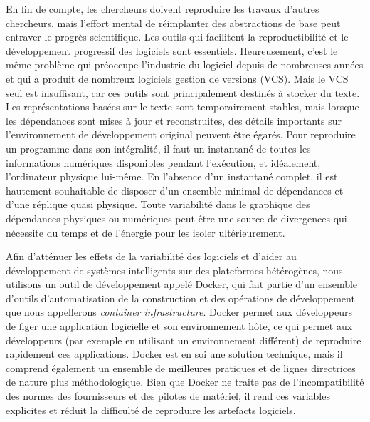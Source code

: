 En fin de compte, les chercheurs doivent reproduire les travaux d'autres chercheurs, mais l'effort mental de réimplanter des abstractions de base peut entraver le progrès scientifique. Les outils qui facilitent la reproductibilité et le développement progressif des logiciels sont essentiels. Heureusement, c'est le même problème qui préoccupe l'industrie du logiciel depuis de nombreuses années et qui a produit de nombreux logiciels gestion de versions (VCS). Mais le VCS seul est insuffisant, car ces outils sont principalement destinés à stocker du texte. Les représentations basées sur le texte sont temporairement stables, mais lorsque les dépendances sont mises à jour et reconstruites, des détails importants sur l'environnement de développement original peuvent être égarés. Pour reproduire un programme dans son intégralité, il faut un instantané de toutes les informations numériques disponibles pendant l'exécution, et idéalement, l'ordinateur physique lui-même. En l'absence d'un instantané complet, il est hautement souhaitable de disposer d'un ensemble minimal de dépendances et d'une réplique quasi physique. Toute variabilité dans le graphique des dépendances physiques ou numériques peut être une source de divergences qui nécessite du temps et de l'énergie pour les isoler ultérieurement.

Afin d'atténuer les effets de la variabilité des logiciels et d'aider au développement de systèmes intelligents sur des plateformes hétérogènes, nous utilisons un outil de développement appelé \href{https://www.docker.com}{Docker}, qui fait partie d'un ensemble d'outils d'automatisation de la construction et des opérations de développement que nous appellerons \textit{container infrastructure}. Docker permet aux développeurs de figer une application logicielle et son environnement hôte, ce qui permet aux développeurs (par exemple en utilisant un environnement différent) de reproduire rapidement ces applications. Docker est en soi une solution technique, mais il comprend également un ensemble de meilleures pratiques et de lignes directrices de nature plus méthodologique. Bien que Docker ne traite pas de l'incompatibilité des normes des fournisseurs et des pilotes de matériel, il rend ces variables explicites et réduit la difficulté de reproduire les artefacts logiciels.

